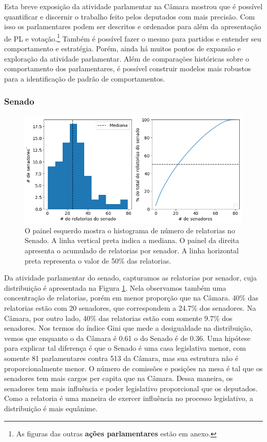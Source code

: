 \documentclass[12pt,a4paper]{article}
\begin{document}
Esta breve exposição da atividade parlamentar na Câmara mostrou que é possível quantificar e discernir o trabalho feito pelos deputados com mais precisão. Com isso os parlamentares podem ser descritos e ordenados para além da apresentação de PL e votação.\footnote{As figuras das outras \textbf{ações parlamentares} estão em anexo.} Também é possível fazer o mesmo para partidos e entender seu comportamento e estratégia. Porém, ainda há muitos pontos de expansão e exploração da atividade parlamentar. Além de comparações históricas sobre o comportamento dos parlamentares, é possível construir modelos mais robustos para a identificação de padrão de comportamentos.

\subsubsection{Senado}

\begin{figure}[H]
\centering
\includegraphics[width=1.0\textwidth]{graficos/camara/atividade/plot_relatorias_senado_senadores.png}
\caption{O painel esquerdo mostra o histograma de número de relatorias no Senado. A linha vertical preta indica a mediana. O painel da direita apresenta o acumulado de relatorias por senador. A linha horizontal preta representa o valor de 50\% das relatorias. }
\label{fig:atividade-parlamentar-relatoria-senadores}
\end{figure} 

Da atividade parlamentar do senado, capturamos as relatorias por senador, cuja distribuição é apresentada na Figura \ref{fig:atividade-parlamentar-relatoria-senadores}. Nela observamos também uma concentração de relatorias, porém em menor proporção que na Câmara. 40\% das relatorias estão com 20 senadores, que correspondem a 24.7\% dos senadores. Na Câmara, por outro lado, 40\% das relatorias estão com somente 9.7\% dos senadores. Nos termos do índice Gini que mede a desigualdade na distribuição, vemos que enquanto o da Câmara é 0.61 o do Senado é de 0.36. Uma hipótese para explicar tal diferença é que o Senado é uma casa legislativa menor, com somente 81 parlamentares contra 513 da Câmara, mas sua estrutura não é proporcionalmente menor. O número de comissões e posições na mesa é tal que os senadores tem mais cargos per capita que na Câmara. Dessa maneira, os senadores tem mais influência e poder legislativo proporcional que os deputados. Como a relatoria é uma maneira de exercer influência no processo legislativo, a distribuição é mais equânime.
\end{document}
